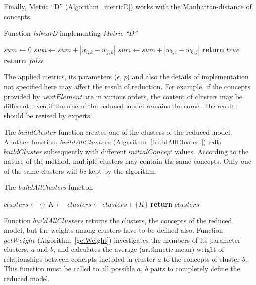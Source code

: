 \documentclass[graybox]{svmult}
\begin{document}
Finally, Metric ``D'' (Algorithm~\ref{metricD}) works with the Manhattan-distance of concepts.

\begin{algorithm}
  \caption{Function \emph{isNearD} implementing \emph{Metric ``D''}}\label{metricD}
  \begin{algorithmic}[1]
      \State $sum \gets 0$
          \State $sum \gets sum + |w_{i, k} - w_{j, k}|$
          \State $sum \gets sum + |w_{k, i} - w_{k, j}|$
        \EndIf
      \EndFor
        \State \textbf{return} $true$
      \Else
        \State \textbf{return} $false$
      \EndIf
    \EndFunction
  \end{algorithmic}
\end{algorithm}

The applied metrics, its parameters ($\epsilon$, $p$) and also the details of implementation not specified here may affect the result of reduction. For example, if the concepts provided by $nextElement$ are in various orders, the content of clusters may be different, even if the size of the reduced model remains the same. The results should be revised by experts.

The $buildCluster$ function creates one of the clusters of the reduced model. Another function, $buildAllClusters$ (Algorithm~\ref{buildAllClusters}) calls $buildCluster$ subsequently with different $initialConcept$ values. According to the nature of the method, multiple clusters may contain the same concepts. Only one of the same clusters will be kept by the algorithm.

\begin{algorithm}
  \caption{The \emph{buildAllClusters} function}\label{buildAllClusters}
  \begin{algorithmic}[1]
      \State $clusters \gets \{\}$
        \State $K \gets$ 
          \State $clusters \gets clusters + \{K\}$
        \EndIf
      \EndFor
      \State \textbf{return} $clusters$
    \EndFunction
  \end{algorithmic}
\end{algorithm}

Function $buildAllClusters$ returns the clusters, the concepts of the reduced model, but the weights among clusters have to be defined also. Function $getWeight$ (Algorithm~\ref{getWeight}) investigates the members of its parameter clusters, $a$ and $b$, and calculates the average (arithmetic mean) weight of relationships between concepts included in cluster $a$ to the concepts of cluster $b$. This function must be called to all possible $a$, $b$ pairs to completely define the reduced model.
\end{document}

